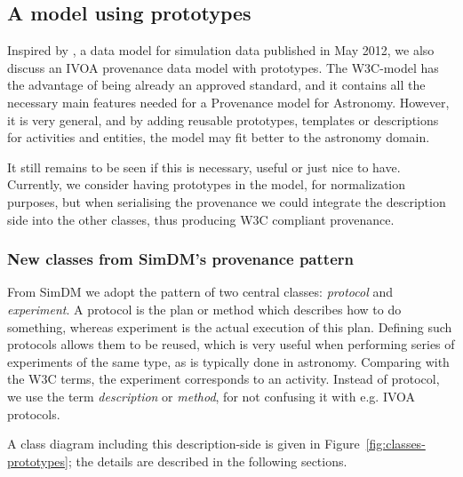 \subsection{A model using prototypes}
Inspired by \cite{std:SimDM}, a data model for simulation data published in May 2012, we also discuss an IVOA provenance data model with prototypes. 
The W3C-model has the advantage of being already an approved standard, and it contains all the necessary main features needed for a Provenance model for Astronomy. However, it is very general, and by adding reusable prototypes, templates or descriptions for activities and entities,  the model may fit better to the astronomy domain.

It still remains to be seen if this is necessary, useful or just nice to have. Currently, we consider having prototypes in the model, for normalization purposes, but when serialising the provenance we could integrate the description side into the other classes, thus producing W3C compliant provenance.



\subsubsection{New classes from SimDM's provenance pattern}
From SimDM we adopt the pattern of two central classes: \emph{protocol} and \emph{experiment}.  A protocol is the plan or method
which describes how to do something, whereas experiment is the actual execution of
this plan. Defining such protocols allows them to be reused, which is very useful when performing series of experiments of the same type, as is typically done in astronomy. Comparing with the W3C terms, the experiment corresponds to an activity. Instead of protocol, we use the term \emph{description} or \emph{method}, 
for not confusing it with e.g. IVOA protocols.

A class diagram including this description-side %
is given in Figure~\ref{fig:classes-prototypes}; the details are described in the following sections.

